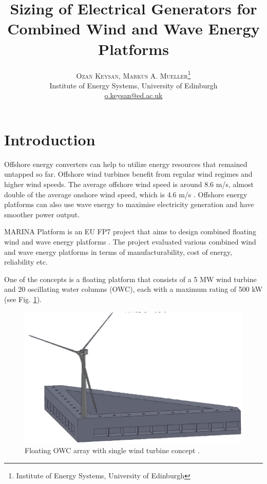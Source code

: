 \documentclass[twocolumn]{article}
\title{\vspace{-15mm}\fontsize{24pt}{10pt}\selectfont\textbf{Sizing of Electrical Generators for Combined Wind and Wave Energy Platforms}} %
\author{
\large
\textsc{Ozan Keysan, Markus A. Mueller}\thanks{Institute of Energy Systems, University of Edinburgh}\\[2mm] %
\normalsize Institute of Energy Systems, University of Edinburgh \\ %
\normalsize \href{mailto:o.keysan@ed.ac.uk}{o.keysan@ed.ac.uk} %
\vspace{-5mm}
}
\date{}
\begin{document}

\section{Introduction}

Offshore energy converters can help to utilize energy resources that remained untapped so far. Offshore wind turbines benefit from regular wind regimes and higher wind speeds. The average offshore wind speed is around 8.6 m/s, almost double of the average onshore wind speed, which is 4.6 m/s \cite{Hau2013}. Offshore energy platforms can also use wave energy to maximise electricity generation and have smoother power output. 

MARINA Platform is an EU FP7 project that aims to design combined floating wind and wave energy platforms \cite{marinaweb}. The project evaluated various combined wind and wave energy platforms in terms of manufacturability, cost of energy, reliability etc. 

One of the concepts is a floating platform that consists of a 5 MW wind turbine and 20 oscillating water columns (OWC), each with a maximum rating of 500 kW \cite{Sullivan2013} (see Fig. \ref{owc_array}).  

  \begin{figure}
    \centering
    \includegraphics[]{owc_array}
    \caption{Floating OWC array with single wind turbine concept \cite{Sullivan2013}.} 
    \label{owc_array}
  \end{figure}
\end{document}
